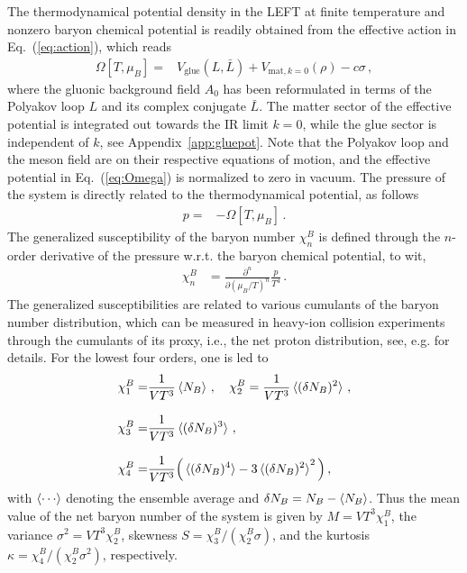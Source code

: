\documentclass[%
reprint,
superscriptaddress,
showpacs,preprintnumbers,
 amsmath,amssymb,
 aps,
prd,
]{revtex4-1}
\def\Eq#1{Eq.~(\ref{#1})}
\def\app#1{Appendix~\ref{#1}}
\begin{document}
The thermodynamical potential density in the LEFT at finite temperature and nonzero baryon chemical potential is readily obtained from the effective action in \Eq{eq:action}, which reads
\begin{align}
  \Omega[T,\mu_B]=&V_{\mathrm{glue}}(L, \bar L)+V_{\mathrm{mat},k=0}(\rho)-c\sigma\,,\label{eq:Omega}
\end{align}
where the gluonic background field $A_0$ has been reformulated in terms of the Polyakov loop $L$ and its complex conjugate $\bar L$. The matter sector of the effective potential is integrated out towards the IR limit $k=0$, while the glue sector is independent of $k$, see \app{app:gluepot}. Note that the Polyakov loop and the meson field are on their respective equations of motion, and the effective potential in \Eq{eq:Omega} is normalized to zero in vacuum. The pressure of the system is directly related to the thermodynamical potential, as follows
\begin{align}
  p=&-\Omega[T,\mu_B]\,.\label{}
\end{align}
The generalized susceptibility of the baryon number $\chi^B_n$ is defined through the $n$-order derivative of the pressure w.r.t. the baryon chemical potential, to wit,
\begin{align}
  \chi_n^{B}&=\frac{\partial^n}{\partial (\mu_B/T)^n}\frac{p}{T^4}\,.\label{eq:suscept}
\end{align}
The generalized susceptibilities are related to various cumulants of the baryon number distribution, which can be measured in heavy-ion collision experiments through the cumulants of its proxy, i.e., the net proton distribution, see, e.g. \cite{Luo:2017faz} for details. For the lowest four orders, one is led to
\begin{align}
\chi^B_1=&\frac{1}{VT^3}\braket{N_B}\,,\quad \chi^B_2=\frac{1}{VT^3}\braket{(\delta N_B)^2}\,,\label{eq:chiB1}\\[2ex]
\chi^B_3=&\frac{1}{VT^3}\braket{(\delta N_B)^3}\,,\\[2ex]
\chi^B_4=&\frac{1}{VT^3}\Big(\braket{(\delta N_B)^4}-3\braket{(\delta N_B)^2}^2\Big)\,,\label{eq:chiB4}
\end{align}
with $\braket{\cdots}$ denoting the ensemble average and $\delta N_B=N_B-\braket{N_B}$. Thus the mean value of the net baryon number of the system is given by $M=VT^3\chi_1^{B}$, the variance $\sigma^2=VT^3\chi_2^{B}$, skewness $S=\chi_3^{B}/(\chi_2^{B}\sigma)$, and the kurtosis $\kappa=\chi_4^{B}/(\chi_2^{B}\sigma^2)$, respectively.
\end{document}
